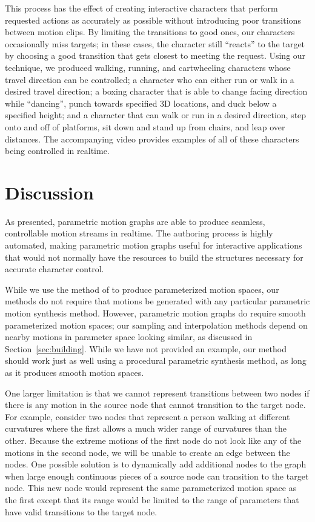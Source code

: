 \documentclass[10pt,twocolumn]{article}
\begin{document}
This process has the effect of creating interactive characters that perform requested actions as accurately as possible without introducing poor transitions between motion clips. By limiting the transitions to good ones, our characters occasionally miss targets; in these cases, the character still ``reacts'' to the target by choosing a good transition that gets closest to meeting the request. Using our technique, we produced walking, running, and cartwheeling characters whose travel direction can be controlled; a character who can either run or walk in a desired travel direction; a boxing character that is able to change facing direction while ``dancing'', punch towards specified 3D locations, and duck below a specified height; and a character that can walk or run in a desired direction, step onto and off of platforms, sit down and stand up from chairs, and leap over distances. The accompanying video provides examples of all of these characters being controlled in realtime.

\section{Discussion}
\label{sec:discussion}

As presented, parametric motion graphs are able to produce seamless, controllable motion streams in realtime. The authoring process is highly automated, making parametric motion graphs useful for interactive applications that would not normally have the resources to build the structures necessary for accurate character control.

While we use the method of \citet{kovar2004} to produce parameterized motion spaces, our methods do not require that motions be generated with any particular parametric motion synthesis method. However, parametric motion graphs do require smooth parameterized motion spaces; our sampling and interpolation methods depend on nearby motions in parameter space looking similar, as discussed in Section~\ref{sec:building}. While we have not provided an example, our method should work just as well using a procedural parametric synthesis method, as long as it produces smooth motion spaces.

One larger limitation is that we cannot represent transitions between two nodes if there is any motion in the source node that cannot transition to the target node. For example, consider two nodes that represent a person walking at different curvatures where the first allows a much wider range of curvatures than the other. Because the extreme motions of the first node do not look like any of the motions in the second node, we will be unable to create an edge between the nodes. One possible solution is to dynamically add additional nodes to the graph when large enough continuous pieces of a source node can transition to the target node. This new node would represent the same parameterized motion space as the first except that its range would be limited to the range of parameters that have valid transitions to the target node.
\end{document}
